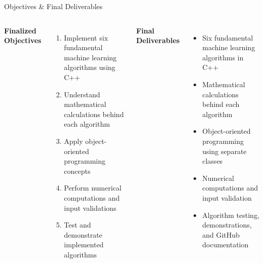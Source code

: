 \documentclass[aspectratio=169,11pt]{beamer}
\begin{document}
\begin{frame}{Objectives \& Final Deliverables}

\begin{columns}[T,totalwidth=\textwidth]


\textbf{\color{GEUBlue}Finalized Objectives}

\begin{enumerate}\itemsep3pt
    \item {Implement six fundamental machine learning algorithms using C++}
    \item {Understand mathematical calculations behind each algorithm}
    \item {Apply object-oriented programming concepts}
    \item {Perform numerical computations and input validations}
    \item {Test and demonstrate implemented algorithms}
\end{enumerate}


\textbf{\color{GEUBlue}Final Deliverables}

\begin{itemize}\itemsep3pt
    \item {Six fundamental machine learning algorithms in C++}
    \item {Mathematical calculations behind each algorithm}
    \item {Object-oriented programming using separate classes}
    \item {Numerical computations and input validation}
    \item {Algorithm testing, demonstrations, and GitHub documentation}
\end{itemize}

\end{columns}

\vfill



\end{frame}
\end{document}

